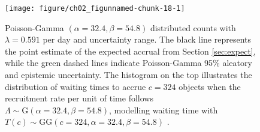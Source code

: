 \begin{figure}
\begin{knitrout}
\color{fgcolor}

{\centering \texttt{[image: figure/ch02\_figunnamed-chunk-18-1]} 

}


\end{knitrout}
  \caption{Poisson-Gamma $(\alpha = 32.4, \beta = 54.8)$ distributed counts with $\lambda = 0.591$ per day and uncertainty range. The black line represents the point estimate of the expected accrual from Section \ref{sec:expect}, while the green dashed lines indicate Poisson-Gamma 95\% aleatory and epistemic uncertainty. The histogram on the top illustrates the distribution of waiting times to accrue $c=324$ objects when the recruitment rate per unit of time follows $\Lambda \sim \textrm{G}(\alpha = 32.4, \beta = 54.8)$, modelling waiting time with $T(c)\sim \textrm{GG} (c=324, \alpha = 32.4, \beta = 54.8)$ \citep{spiegelhalter2011visualizing, pkgacc}.}
  \label{fig:2_14}
\end{figure}
